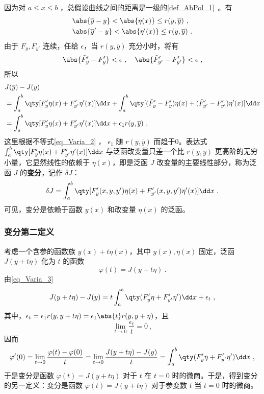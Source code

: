 因为对 $a\leq x\leq b$ ，总假设曲线之间的距离是一级的\autoref{def_AbPol_1}~。有
\begin{equation}
\begin{aligned}
&\abs{\overline{y}-y}<\abs{\eta(x)}\leq r(y,\overline{y})~,\\
&\abs{\overline{y}'-y}<\abs{\eta'(x)}\leq r(y,\overline{y})~.
\end{aligned}
\end{equation}
由于 $F_y,F_{y'}$ 连续，任给 $\epsilon$，当 $r(y,\overline{y})$ 充分小时，将有
\begin{equation}\label{eq_Varia_2}
\abs{\tilde{F}'_y-F'_y}<\epsilon~,\quad\abs{\tilde{F}'_{y'}-F'_{y'}}<\epsilon~,
\end{equation}
所以
\begin{equation}\label{eq_Varia_3}
\begin{aligned}
&J(\overline{y})-J(y)\\
&=\int_a^b\qty[F'_y\eta(x)+F'_{y'}\eta'(x)]\dd x+\int_a^b\qty[(\tilde{F}'_y-F'_y)\eta(x)+(\tilde{F}'_{y'}-F'_{y'})\eta'(x)]\dd x\\
&=\int_a^b\qty[F'_y\eta(x)+F'_{y'}\eta'(x)]\dd x+\epsilon_1r(y,\overline{y})~.
\end{aligned}
\end{equation}
这里根据不等式\autoref{eq_Varia_2} ， $\epsilon_1$ 随 $r(y,\overline{y})$ 而趋于0。表达式 $\int_a^b\qty[F'_y\eta(x)+F'_{y'}\eta'(x)]\dd x$ 与泛函改变量只差一个比 $r(y,\overline{y})$ 更高阶的无穷小量，它显然线性的依赖于 $\eta(x)$，即是泛函 $J$ 改变量的主要线性部分，称为泛函 $J$ 的\textbf{变分}，记作 $\delta{J}$：
\begin{equation}\label{eq_Varia_4}
\delta J=\int_a^b\qty[F'_y(x,y,y')\eta(x)+F'_{y'}(x,y,y')\eta'(x)]\dd x~.
\end{equation}
可见，变分是依赖于函数 $y(x)$ 和改变量 $\eta(x)$ 的泛函。
\subsubsection{变分第二定义}
考虑一个含参的函数族 $y(x)+t\eta(x)$，其中 $y(x),\eta(x)$ 固定，泛函 $J(y+t\eta)$ 化为 $t$ 的函数
\begin{equation}
\varphi(t)=J(y+t\eta)~.
\end{equation}
由\autoref{eq_Varia_3} 
\begin{equation}
J(y+t\eta)-J(y)=t\int_a^b\qty(F'_y\eta+F'_{y'}\eta')\dd x+\epsilon_t~,
\end{equation}
其中，$\epsilon_t=\epsilon_1r(y,y+t\eta)=\epsilon_1\abs{t}r(y,y+\eta)$，且
\begin{equation}
\lim_{t\rightarrow 0}\frac{\epsilon_t}{t}=0~,
\end{equation}
因而
\begin{equation}
\varphi'(0)=\lim_{t\rightarrow 0}\frac{\varphi(t)-\varphi(0)}{t}=\lim_{t\rightarrow 0}\frac{J(y+t\eta)-J(y)}{t}=\int_a^b\qty(F'_y\eta+F'_{y'}\eta')\dd x~,
\end{equation}
于是变分是函数 $\varphi(t)=J(y+t\eta)$ 对于 $t$ 在 $t=0$ 时的微商。于是，得到变分的另一定义：变分是函数 $\varphi(t)=J(y+t\eta)$ 对于参变数 $t$ 当 $t=0$ 时的微商。
